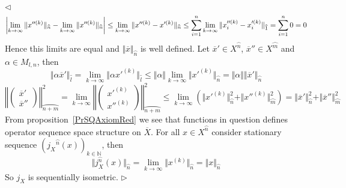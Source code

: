 \documentclass[12pt]{article}
\newenvironment{proof}{\par $\triangleleft$}{$\triangleright$}
\begin{document}
\begin{proof}
$$
\left|\lim\limits_{k\to\infty}\Vert
x''^{(k)}\Vert_{\wideparen{n}}-\lim\limits_{k\to\infty}\Vert
x''^{(k)}\Vert_{\wideparen{n}}\right|\leq \lim\limits_{k\to\infty}\Vert
x''^{(k)}-x'^{(k)}\Vert_{\wideparen{n}}\leq
\sum\limits_{i=1}^n\lim\limits_{k\to\infty}\Vert
x_i''^{(k)}-x_i'^{(k)}\Vert_{\wideparen{1}}\\
=\sum\limits_{i=1}^n0=0
$$
Hence this limits are equal and $\Vert \overline{x}\Vert_{\wideparen{n}}$ is 
well defined. Let $\overline{x}'\in X^{\wideparen{n}}$, 
$\overline{x}''\in X^{\wideparen{m}}$ and $\alpha\in M_{l,n}$, then
$$
\Vert\alpha\overline{x}'\Vert_{\wideparen{l}}
=\lim\limits_{k\to\infty}\Vert\alpha x'^{(k)}\Vert_{\wideparen{l}}
\leq\Vert\alpha\Vert\lim\limits_{k\to\infty}\Vert x'^{(k)}\Vert_{\wideparen{n}}
=\Vert\alpha\Vert\Vert\overline{x}'\Vert_{\wideparen{n}}
$$
$$
\left\Vert\begin{pmatrix} \overline{x}'\\
\overline{x}''\end{pmatrix}\right\Vert_{\wideparen{n+m}}^2
=\lim\limits_{k\to\infty}\left\Vert\begin{pmatrix} x'^{(k)}\\
x''^{(k)}\end{pmatrix}\right\Vert_{\wideparen{n+m}}^2
\leq\lim\limits_{k\to\infty}(\Vert x'^{(k)}\Vert_{\wideparen{n}}^2+\Vert
x''^{(k)}\Vert_{\wideparen{m}}^2)
=\Vert\overline{x}'\Vert_{\wideparen{n}}^2
+\Vert\overline{x}''\Vert_{\wideparen{m}}^2
$$
From proposition~\ref{PrSQAxiomRed} we see that functions in question defines 
operator sequence space structure on $\overline{X}$. For all 
$x\in X^{\wideparen{n}}$ consider stationary sequence 
${({j_X}^{\wideparen{n}}(x))}_{k\in\mathbb{N}}$, then
$$
\Vert j_X^{\wideparen{n}}(x)\Vert_{\wideparen{n}} =\lim\limits_{k\to\infty}\Vert
x^{(k)}\Vert_{\wideparen{n}} =\Vert x\Vert_{\wideparen{n}}
$$
So $j_X$ is sequentially isometric.
\end{proof}
\end{document}
